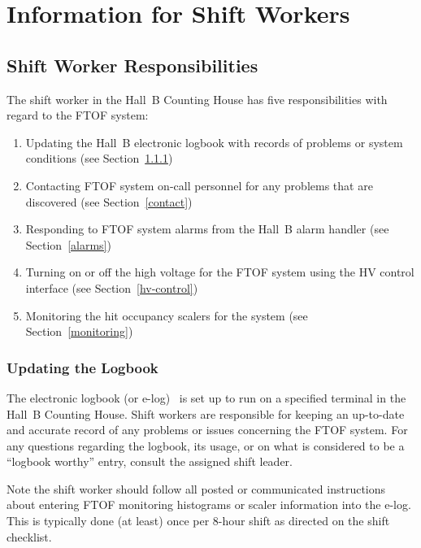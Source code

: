 \documentclass[12pt]{article}
\begin{document}
\clearpage

\vfil
\eject

\section{Information for Shift Workers}

\subsection{Shift Worker Responsibilities}

The shift worker in the Hall~B Counting House has five responsibilities with regard to 
the FTOF system:

\begin{enumerate}
\item Updating the Hall~B electronic logbook with records of problems or system 
conditions (see Section~\ref{logbook})

\item Contacting FTOF system on-call personnel for any problems that are discovered 
(see Section~\ref{contact})

\item Responding to FTOF system alarms from the Hall~B alarm handler (see 
Section~\ref{alarms})

\item Turning on or off the high voltage for the FTOF system using the HV control 
interface (see Section~\ref{hv-control})

\item Monitoring the hit occupancy scalers for the system (see Section~\ref{monitoring})
\end{enumerate}

\subsubsection{Updating the Logbook}
\label{logbook}

The electronic logbook (or e-log)~\cite{e-log} is set up to run on a specified terminal 
in the Hall~B Counting House. Shift workers are responsible for keeping an up-to-date 
and accurate record of any problems or issues concerning the FTOF system. For any 
questions regarding the logbook, its usage, or on what is considered to be a ``logbook 
worthy'' entry, consult the assigned shift leader.

Note the shift worker should follow all posted or communicated instructions about 
entering FTOF monitoring histograms or scaler information into the e-log. This is
typically done (at least) once per 8-hour shift as directed on the shift checklist.
\end{document}
